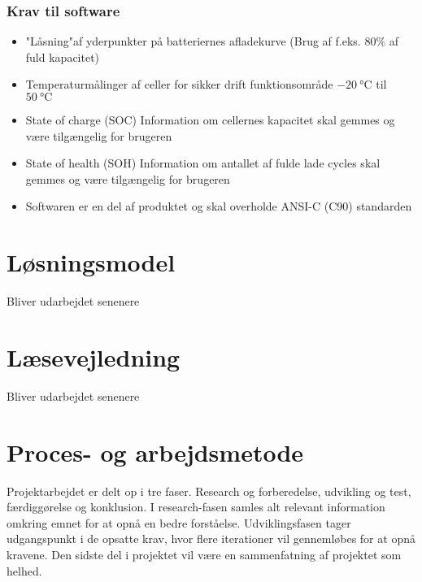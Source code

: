 \subsubsection{Krav til software}
\begin{itemize}[noitemsep]
	\item "Låsning"\space af yderpunkter på batteriernes afladekurve (Brug af f.eks. 80\% af fuld kapacitet)
	\item Temperaturmålinger af celler for sikker drift \textemdash \space funktionsområde $\SI{-20}{\celsius}$ til $\SI{50}{\celsius}$
	\item State of charge (SOC) \textemdash \space Information om cellernes kapacitet skal gemmes og være tilgængelig for brugeren
	\item State of health (SOH) \textemdash \space Information om antallet af fulde lade cycles skal gemmes og være tilgængelig for brugeren
	\item Softwaren er en del af produktet og skal overholde ANSI-C (C90) standarden
\end{itemize}


\section{Løsningsmodel}
Bliver udarbejdet senenere

\section{Læsevejledning}
Bliver udarbejdet senenere

\section{Proces- og arbejdsmetode}
Projektarbejdet er delt op i tre faser. Research og forberedelse, udvikling og test, færdiggørelse og konklusion. I research-fasen samles alt relevant information omkring emnet for at opnå en bedre forståelse. Udviklingsfasen tager udgangspunkt i de opsatte krav, hvor flere iterationer vil gennemløbes for at opnå kravene. Den sidste del i projektet vil være en sammenfatning af projektet som helhed.




